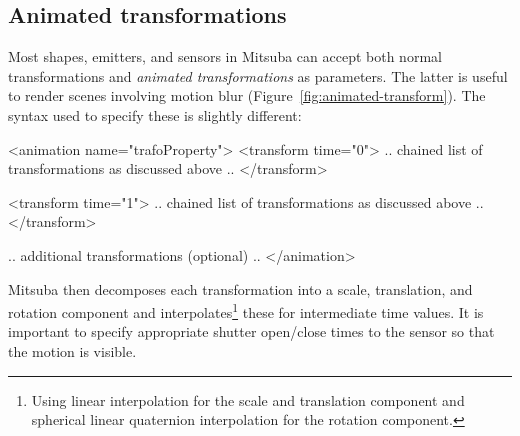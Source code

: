 \subsection{Animated transformations}
Most shapes, emitters, and sensors in Mitsuba can accept both normal transformations
and \emph{animated transformations} as parameters. The latter is useful to
render scenes involving motion blur (Figure~\ref{fig:animated-transform}). The syntax used to specify these
is slightly different:
\begin{xml}
<animation name="trafoProperty">
  <transform time="0">
     .. chained list of transformations as discussed above ..
  </transform>

  <transform time="1">
     .. chained list of transformations as discussed above ..
  </transform>

  .. additional transformations (optional) ..
</animation>
\end{xml}

Mitsuba then decomposes each transformation into a scale, translation, and
rotation component and interpolates\footnote{Using linear interpolation
for the scale and translation component and spherical linear quaternion
interpolation for the rotation component.} these for intermediate
time values.
It is important to specify appropriate shutter open/close times
to the sensor so that the motion is visible.
